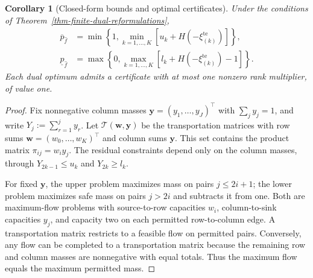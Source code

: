 \documentclass[review,11pt,3p,authoryear,nopreprintline]{elsarticle}
\newtheorem{corollary}{Corollary}
\begin{document}
\begin{corollary}[Closed-form bounds and optimal certificates]
  \label{thm-closed-form-bounds}
  Under the conditions of Theorem~\ref{thm-finite-dual-reformulations},
  \begin{align}
    \overline p_{\hat f}
      &=\min\left\{1,\min_{k=1,\ldots,K}\left[u_k+H\left(-\xi_{(k)}^{\mathrm{te}}\right)\right]\right\},
      \label{eq-dw-closed-upper}\\
    \underline p_{\hat f}
      &=\max\left\{0,\max_{k=1,\ldots,K}\left[l_k+H\left(-\xi_{(k)}^{\mathrm{te}}\right)-1\right]\right\}.
      \label{eq-dw-closed-lower}
  \end{align}
  Each dual optimum admits a certificate with at most one nonzero rank multiplier, of value one.
\end{corollary}
\begin{proof}
  Fix nonnegative column masses $\bm y=(y_1,\ldots,y_J)^\top$ with $\sum_j y_j=1$, and write $Y_j:=\sum_{r=1}^{j}y_r$. Let $\mathcal T(\bm w,\bm y)$ be the transportation matrices with row sums $\bm w=(w_0,\ldots,w_K)^\top$ and column sums $\bm y$. This set contains the product matrix $\pi_{ij}=w_i y_j$. The residual constraints depend only on the column masses, through $Y_{2k-1}\le u_k$ and $Y_{2k}\ge l_k$.

  For fixed $\bm y$, the upper problem maximizes mass on pairs $j\le2i+1$; the lower problem maximizes safe mass on pairs $j>2i$ and subtracts it from one. Both are maximum-flow problems with source-to-row capacities $w_i$, column-to-sink capacities $y_j$, and capacity two on each permitted row-to-column edge. A transportation matrix restricts to a feasible flow on permitted pairs. Conversely, any flow can be completed to a transportation matrix because the remaining row and column masses are nonnegative with equal totals. Thus the maximum flow equals the maximum permitted mass.


\end{proof}
\end{document}
